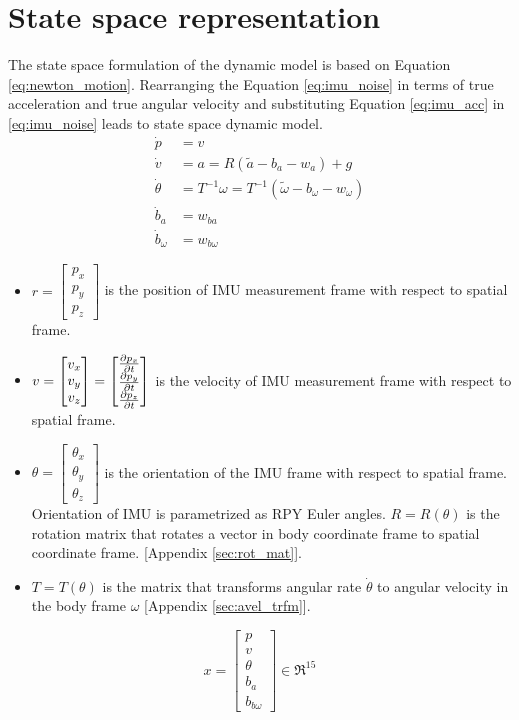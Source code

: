 \section{State space representation}
The state space formulation of the dynamic model is based on Equation \ref{eq:newton_motion}. Rearranging the Equation \ref{eq:imu_noise} in terms of true acceleration and true angular velocity and substituting Equation \ref{eq:imu_acc} in \ref{eq:imu_noise} leads to state space dynamic model. 
\begin{equation}
    \label{eq:dyn_imu}
    \begin{split}
    \dot{p} &= v \\
    \dot{v} &= a = R(\tilde{a} - b_a - w_a)+g \\
    \dot{\theta} &= T^{-1}\omega = T^{-1}(\tilde{\omega} - b_\omega - w_\omega) \\
    \dot{b}_a &= w_{ba}\\
    \dot{b}_\omega &= w_{b\omega}
    \end{split}
\end{equation}
\begin{itemize}
    \item $ r = \begin{bmatrix} p_x \\ p_y \\ p_z \end{bmatrix}$ is the position of IMU measurement frame with respect to spatial frame.
    \item $ v = \begin{bmatrix} v_x \\ v_y \\ v_z \end{bmatrix} = \begin{bmatrix} \frac{\partial {p_x}}{\partial {t}} \\ \frac{\partial {p_y}}{\partial {t}} \\ \frac{\partial {p_z}}{\partial {t}} \end{bmatrix}$ is the velocity of IMU measurement frame with respect to spatial frame.
    \item $ \theta = \begin{bmatrix} \theta_x \\ \theta_y \\ \theta_z \end{bmatrix}$ is the orientation of the IMU frame with respect to spatial frame. Orientation of IMU is parametrized as RPY Euler angles. $R=R(\theta)$ is the rotation matrix that rotates a vector in body coordinate frame to spatial coordinate frame. [Appendix \ref{sec:rot_mat}].
    \item $T=T(\theta)$ is the matrix that transforms angular rate $\dot{\theta}$ to angular velocity in the body frame $\omega$ [Appendix \ref{sec:avel_trfm}].
\end{itemize}
\begin{equation}
x = \begin{bmatrix} p \\ v \\ \theta \\ b_a \\ b_{b\omega} \end{bmatrix} \in \Re^{15}
\end{equation}
